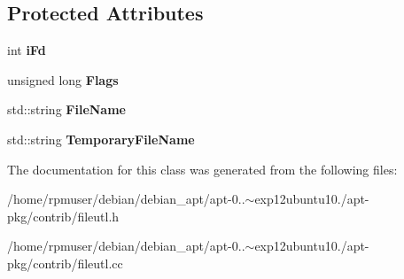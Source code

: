 \subsection*{\-Protected \-Attributes}
\begin{DoxyCompactItemize}
\item 
int {\bfseries i\-Fd}\label{classFileFd_af5d4caeb119a4aa84f6b7ff10caa9665}

\item 
unsigned long {\bfseries \-Flags}\label{classFileFd_a15eb852dd5568416ca012c6dcbff021b}

\item 
std\-::string {\bfseries \-File\-Name}\label{classFileFd_a21d40ee67459129a67fe0d8941c5b7c8}

\item 
std\-::string {\bfseries \-Temporary\-File\-Name}\label{classFileFd_a49180629bb18774fa01525c47ab60e33}

\end{DoxyCompactItemize}


\-The documentation for this class was generated from the following files\-:\begin{DoxyCompactItemize}
\item 
/home/rpmuser/debian/debian\-\_\-apt/apt-\/0..$\sim$exp12ubuntu10./apt-\/pkg/contrib/fileutl.\-h\item 
/home/rpmuser/debian/debian\-\_\-apt/apt-\/0..$\sim$exp12ubuntu10./apt-\/pkg/contrib/fileutl.\-cc\end{DoxyCompactItemize}
